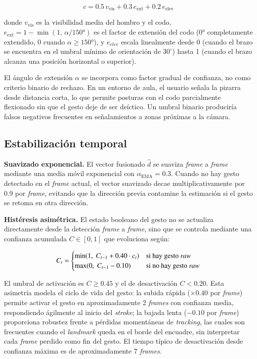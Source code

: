 \documentclass[12pt]{report} %
\begin{document}
\begin{equation}
  c = 0.5\,v_{\text{vis}} + 0.3\,e_{\text{ext}} + 0.2\,e_{\text{elev}}
\end{equation}

donde $v_{\text{vis}}$ es la visibilidad media del hombro y el codo, $e_{\text{ext}} = 1 - \min(1,\,\alpha / 150°)$ es el factor de extensión del codo (0° completamente extendido, 0 cuando $\alpha \geq 150°$), y $e_{elev}$ escala linealmente desde 0 (cuando el brazo se encuentra en el umbral mínimo de orientación de $30^{\circ}$) hasta 1 (cuando el brazo alcanza una posición horizontal o superior).

El ángulo de extensión $\alpha$ se incorpora como factor gradual de confianza, no como criterio binario de rechazo. En un entorno de aula, el usuario señala la pizarra desde distancia corta, lo que permite posturas con el codo parcialmente flexionado sin que el gesto deje de ser deíctico. Un umbral binario produciría falsos negativos frecuentes en señalamientos a zonas próximas a la cámara.

\subsection{Estabilización temporal}

\textbf{Suavizado exponencial.} El vector fusionado $\hat{d}$ se suaviza \textit{frame} a \textit{frame} mediante una media móvil exponencial con $\alpha_{\text{EMA}} = 0.3$. Cuando no hay gesto detectado en el \textit{frame} actual, el vector suavizado decae multiplicativamente por 0.9 por \textit{frame}, evitando que la dirección previa contamine la estimación si el gesto se retoma en otra dirección.

\textbf{Histéresis asimétrica.} El estado booleano del gesto no se actualiza directamente desde la detección \textit{frame} a \textit{frame}, sino que se controla mediante una confianza acumulada $C \in [0,1]$ que evoluciona según:

\begin{equation}
  C_t = \begin{cases}
    \min(1,\;C_{t-1} + 0.40 \cdot c_t) & \text{si hay gesto \textit{raw}} \\
    \max(0,\;C_{t-1} - 0.10)            & \text{si no hay gesto \textit{raw}}
  \end{cases}
\end{equation}

El umbral de activación es $C \geq 0.45$ y el de desactivación $C < 0.20$. Esta asimetría modela el ciclo de vida del gesto: la subida rápida ($\times 0.40$ por \textit{frame}) permite activar el gesto en aproximadamente 2 \textit{frames} con confianza media, respondiendo ágilmente al inicio del \textit{stroke}; la bajada lenta ($-0.10$ por \textit{frame}) proporciona robustez frente a pérdidas momentáneas de \textit{tracking}, las cuales son frecuentes cuando el \textit{landmark} queda en el borde del encuadre, sin interpretar cada \textit{frame} perdido como fin del gesto. El tiempo típico de desactivación desde confianza máxima es de aproximadamente 7 \textit{frames}.
\end{document}
